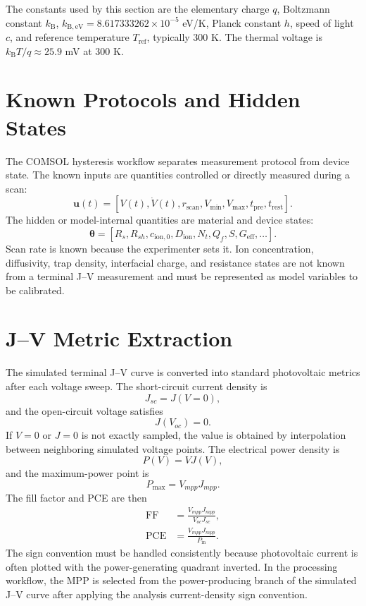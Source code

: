 The constants used by this section are the elementary charge $q$, Boltzmann
constant $k_{\mathrm{B}}$, $k_{\mathrm{B,eV}}=8.617333262\times10^{-5}$ eV/K,
Planck constant $h$, speed of light $c$, and reference temperature
$T_{\mathrm{ref}}$, typically 300 K. The thermal voltage is
$k_{\mathrm{B}}T/q\approx25.9$ mV at 300 K.

\section{Known Protocols and Hidden States}

The COMSOL hysteresis workflow separates measurement protocol from device
state. The known inputs are quantities controlled or directly measured during a
scan:
\begin{equation}
\mathbf{u}(t) =
\left[V(t), \dot{V}(t), r_{\mathrm{scan}}, V_{\min}, V_{\max},
t_{\mathrm{pre}}, t_{\mathrm{rest}}\right].
\end{equation}
The hidden or model-internal quantities are material and device states:
\begin{equation}
\boldsymbol{\theta} =
\left[R_s, R_{sh}, c_{\mathrm{ion},0}, D_{\mathrm{ion}},
N_t, Q_f, S, G_{\mathrm{eff}}, \ldots\right].
\end{equation}
Scan rate is known because the experimenter sets it. Ion concentration,
diffusivity, trap density, interfacial charge, and resistance states are not
known from a terminal J--V measurement and must be represented as model
variables to be calibrated.

\section{J--V Metric Extraction}

The simulated terminal J--V curve is converted into standard photovoltaic
metrics after each voltage sweep. The short-circuit current density is
\begin{equation}
J_{sc}=J(V=0),
\end{equation}
and the open-circuit voltage satisfies
\begin{equation}
J(V_{oc})=0.
\end{equation}
If $V=0$ or $J=0$ is not exactly sampled, the value is obtained by interpolation
between neighboring simulated voltage points. The electrical power density is
\begin{equation}
P(V)=VJ(V),
\end{equation}
and the maximum-power point is
\begin{equation}
P_{\max}=V_{mpp}J_{mpp}.
\end{equation}
The fill factor and PCE are then
\begin{align}
\mathrm{FF} &=
\frac{V_{mpp}J_{mpp}}{V_{oc}J_{sc}},\\
\mathrm{PCE} &=
\frac{V_{mpp}J_{mpp}}{P_{\mathrm{in}}}.
\end{align}
The sign convention must be handled consistently because photovoltaic current
is often plotted with the power-generating quadrant inverted. In the processing
workflow, the MPP is selected from the power-producing branch of the simulated
J--V curve after applying the analysis current-density sign convention.

